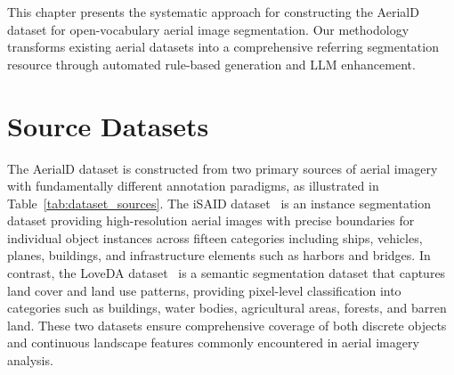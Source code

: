 \cleardoublepage
\label{chap:implement}

This chapter presents the systematic approach for constructing the AerialD dataset for open-vocabulary aerial image segmentation. Our methodology transforms existing aerial datasets into a comprehensive referring segmentation resource through automated rule-based generation and LLM enhancement.

\section{Source Datasets}

\noindent The AerialD dataset is constructed from two primary sources of aerial imagery with fundamentally different annotation paradigms, as illustrated in Table~\ref{tab:dataset_sources}. The iSAID dataset~\cite{zamir2019isaid} is an instance segmentation dataset providing high-resolution aerial images with precise boundaries for individual object instances across fifteen categories including ships, vehicles, planes, buildings, and infrastructure elements such as harbors and bridges. In contrast, the LoveDA dataset~\cite{wang2021loveda} is a semantic segmentation dataset that captures land cover and land use patterns, providing pixel-level classification into categories such as buildings, water bodies, agricultural areas, forests, and barren land. These two datasets ensure comprehensive coverage of both discrete objects and continuous landscape features commonly encountered in aerial imagery analysis.


